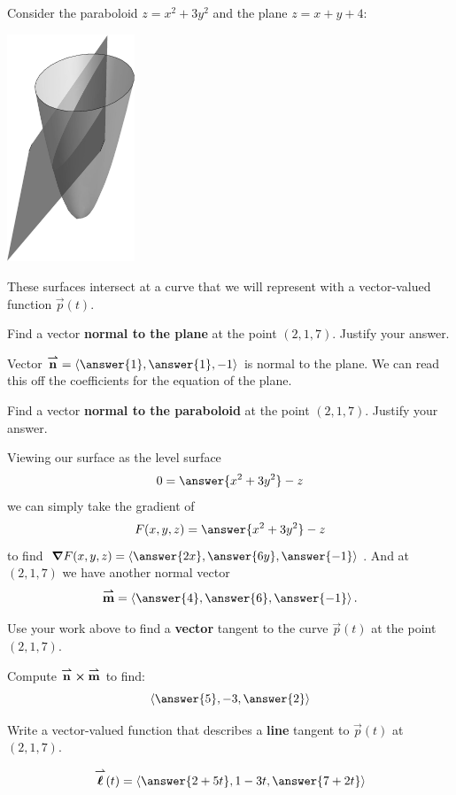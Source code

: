 \documentclass{ximera}
\author{Bart Snapp}
\begin{document}
Consider the paraboloid $z = x^2+3y^2$ and the plane $z=x+y+4$:
\begin{image}[1.5in]
  \includegraphics[width=1.5in]{planeAndPara.jpg}
\end{image}
These surfaces intersect at a curve that we will represent with a
vector-valued function $\vec{p}(t)$.
\begin{problem}
  Find a vector \textbf{normal to the plane} at the point
  $(2,1,7)$. Justify your answer.
  \begin{prompt}
    Vector $\vec{n} = \vector{\answer{1},\answer{1},-1}$ is normal to
    the plane. We can read this off the coefficients for the equation
    of the plane.
  \end{prompt}

  \vfill
  
\end{problem}


\begin{problem}
  Find a vector \textbf{normal to the paraboloid} at the point
  $(2,1,7)$. Justify your answer.
  \begin{prompt}
    Viewing our surface as the level surface
    \[
    0 = \answer{x^2+3y^2}-z
    \]
    we can simply take the gradient of
    \[
    F(x,y,z) = \answer{x^2+3y^2}-z
    \]
    to find $\grad F(x,y,z) =
    \vector{\answer{2x},\answer{6y},\answer{-1}}$. And at $(2,1,7)$ we have another normal vector
      \[
      \vec{m} = \vector{\answer{4},\answer{6},\answer{-1}}.
      \]
  \end{prompt}

  \vfill
  
\end{problem}

\begin{problem}
  Use your work above to find a \textbf{vector} tangent to the curve $\vec{p}(t)$ at the point $(2,1,7)$.
  \begin{prompt}
    Compute ${\overset{\boldsymbol{\rightharpoonup}}{\mathbf{n}}}\boldsymbol\times{\overset{\boldsymbol{\rightharpoonup}}{\mathbf{m}}}$ to find:
    \[
    \vector{\answer{5},-3,\answer{2}}
    \]
  \end{prompt}

  \vfill
  
\end{problem}

\begin{problem}
  Write a vector-valued function that describes a \textbf{line}
  tangent to $\vec{p}(t)$ at $(2,1,7)$.
  \begin{prompt}
    \[
    \vecl(t) = \vector{\answer{2+5t},1-3t,\answer{7+2t}}
    \]
  \end{prompt}
\end{problem}

\vfill
\end{document}
